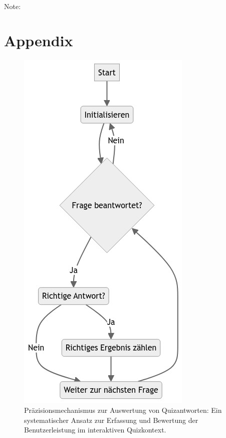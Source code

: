 \documentclass[10pt, fleqn]{scrartcl}
\begin{document}
\noindent
\vspace{1cm} \\
Note:


\newpage

\printbibliography


\newpage

\appendix

\section{Appendix}

\begin{figure}[h!]
	\centering
	\includegraphics[scale=0.4]{flowcharts/flowchart2.png}
	\caption{Präzisionsmechanismus zur Auswertung von Quizantworten: Ein systematischer Ansatz zur Erfassung und Bewertung der Benutzerleistung im interaktiven Quizkontext.}
	\label{fig:counting-mechanism}
\end{figure}
\end{document}
